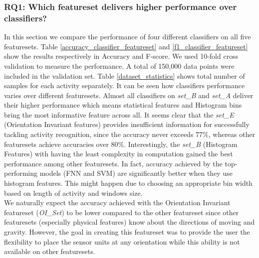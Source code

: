 \documentclass[journal,article,submit,moreauthors,pdftex]{Definitions/mdpi}
\begin{document}
\subsubsection{RQ1: Which featureset delivers higher performance over classifiers?}
In this section we compare the performance of four different classifiers on all five featuresets. Table \ref{accuracy_classifier_featureset} and \ref{f1_classifier_featureset} show the results respectively in Accuracy and F-score. We used 10-fold cross validation to measure the performance. A total of 150,000 data points were included in the validation set. Table \ref{dataset_statistics} shows total number of samples for each activity separately. It can be seen how classifiers performance varies over different featuresets. Almost all classifiers on \textit{set\_B} and \textit{set\_A} deliver their higher performance which means statistical features and Histogram bins bring the most informative feature across all. It seems clear that the \textit{set\_E} (Orientation Invariant features) provides insufficient information for successfully tackling activity recognition, since the accuracy never exceeds 77\%, whereas other featuresets achieve accuracies over 80\%. Interestingly, the \textit{set\_B} (Histogram Features) with having the least complexity in computation gained the best performance among other featuresets. In fact, accuracy achieved by the top-performing models (FNN and SVM) are significantly better when they use histogram features. This might happen due to choosing an appropriate bin width based on length of activity and windows size.\\
We naturally expect the accuracy achieved with the Orientation Invariant featureset (\textit{OI\_Set}) to be lower	compared to the other featureset since other featuresets (especially physical features) know about the directions of moving and gravity. However, the goal in creating this featureset was to provide the user the flexibility to place the sensor units at any orientation while this ability is not available on other featuresets.
\end{document}
